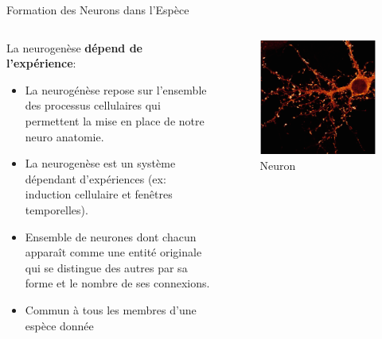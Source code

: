 \documentclass{beamer}
\begin{document}
\begin{frame}{Formation des Neurons dans l'Espèce}
\begin{columns}
\begin{column}{0.7\textwidth}
\begin{block}{}
La neurogenèse \textbf{dépend de l’expérience}:
\begin{itemize}
    \item La neurogénèse repose sur l’ensemble des processus cellulaires qui permettent la mise en place de notre neuro anatomie.
    \item La neurogenèse est un système dépendant d’expériences (ex: induction cellulaire et fenêtres temporelles).
    \item Ensemble de neurones dont chacun apparaît comme une entité originale qui se distingue des autres par sa forme et le nombre de ses connexions.
    \item Commun à tous les membres d’une espèce donnée
\end{itemize}
\end{block}
\end{column}
\begin{column}{0.3\textwidth}
\begin{block}{}
\begin{figure}
    \centering
    \includegraphics[width=\textwidth]{neuroGenesis01.png}
    \caption{Neuron}
    \label{fig:my_label}
\end{figure}
\end{block}
\end{column}
\end{columns}
\end{frame}
\end{document}
